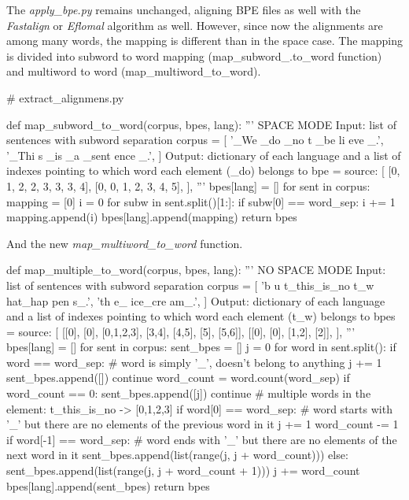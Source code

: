 The \emph{apply\_bpe.py} remains unchanged, aligning BPE files as well with the \emph{Fastalign} or \emph{Eflomal} algorithm as well. However, since now the alignments are among many words, the mapping is different than in the space case. The mapping is divided into subword to word mapping (map\_subword\_.to\_word function) and multiword to word (map\_multiword\_to\_word).

\begin{python}
# extract_alignmens.py

def map_subword_to_word(corpus, bpes, lang):
  '''
  SPACE MODE
  Input: list of sentences with subword separation
  corpus =  [
    '_We _do _no t _be li eve _.',
    '_Thi s _is _a _sent ence _.',
  ]
  Output: dictionary of each language and 
  a list of indexes pointing to which word each element (_do) belongs to
  bpe = {
    source:
    [
      [0, 1, 2, 2, 3, 3, 3, 4],
      [0, 0, 1, 2, 3, 4, 5],
    ],
  }
  '''
  bpes[lang] = []
  for sent in corpus:
    mapping = [0]
    i = 0
    for subw in sent.split()[1:]:
      if subw[0] == word_sep:
        i += 1
      mapping.append(i)
    bpes[lang].append(mapping)
  return bpes
\end{python}

And the new \emph{map\_multiword\_to\_word} function.

\begin{python}
def map_multiple_to_word(corpus, bpes, lang):
  '''
  NO SPACE MODE
  Input: list of sentences with subword separation
  corpus =  [
    'b u t_this_is_no t_w hat_hap pen s_.',
    'th e_ ice_cre am_.',
  ]
  Output: dictionary of each language and 
  a list of indexes pointing to which word each element (t\_w) belongs to
  bpes = {
    source:
    [
      [[0], [0], [0,1,2,3], [3,4], [4,5], [5], [5,6]],
      [[0], [0], [1,2], [2]],
    ],
  }
  '''
  bpes[lang] = []
  for sent in corpus:
    sent_bpes = []
    j = 0
    for word in sent.split():
      if word == word_sep:
        # word is simply '_', doesn't belong to anything
        j += 1
        sent_bpes.append([])
        continue
      word_count = word.count(word_sep)
      if word_count == 0:
        sent_bpes.append([j])
        continue
      # multiple words in the element: t_this_is_no -> [0,1,2,3]
      if word[0] == word_sep:
        # word starts with '_' but there are no elements of the previous word in it
        j += 1
        word_count -= 1
      if word[-1] == word_sep:
        # word ends with '_' but there are no elements of the next word in it
        sent_bpes.append(list(range(j, j + word_count)))
      else:
        sent_bpes.append(list(range(j, j + word_count + 1)))
      j += word_count
    bpes[lang].append(sent_bpes)
  return bpes
\end{python}

